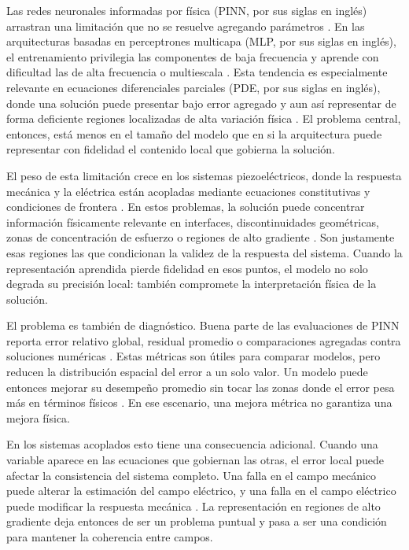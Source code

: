 \label{sec:justificacion}

Las redes neuronales informadas por física (PINN, por sus siglas en inglés) arrastran una limitación que no se resuelve agregando parámetros \cite{grossmann2024,krishnapriyan2021}. En las arquitecturas basadas en perceptrones multicapa (MLP, por sus siglas en inglés), el entrenamiento privilegia las componentes de baja frecuencia y aprende con dificultad las de alta frecuencia o multiescala \cite{rahaman2019,tancik2020,wang2021eigenvector}. Esta tendencia es especialmente relevante en ecuaciones diferenciales parciales (PDE, por sus siglas en inglés), donde una solución puede presentar bajo error agregado y aun así representar de forma deficiente regiones localizadas de alta variación física \cite{krishnapriyan2021,deryckmishra2022,grossmann2024}. El problema central, entonces, está menos en el tamaño del modelo que en si la arquitectura puede representar con fidelidad el contenido local que gobierna la solución.

El peso de esta limitación crece en los sistemas piezoeléctricos, donde la respuesta mecánica y la eléctrica están acopladas mediante ecuaciones constitutivas y condiciones de frontera \cite{tandis2025piezoelectric,mouratidou2026shunted}. En estos problemas, la solución puede concentrar información físicamente relevante en interfaces, discontinuidades geométricas, zonas de concentración de esfuerzo o regiones de alto gradiente \cite{wang2004intensity}. Son justamente esas regiones las que condicionan la validez de la respuesta del sistema. Cuando la representación aprendida pierde fidelidad en esos puntos, el modelo no solo degrada su precisión local: también compromete la interpretación física de la solución.

El problema es también de diagnóstico. Buena parte de las evaluaciones de PINN reporta error relativo global, residual promedio o comparaciones agregadas contra soluciones numéricas \cite{raissi2019,lu2021deepxde,grossmann2024}. Estas métricas son útiles para comparar modelos, pero reducen la distribución espacial del error a un solo valor. Un modelo puede entonces mejorar su desempeño promedio sin tocar las zonas donde el error pesa más en términos físicos \cite{krishnapriyan2021}. En ese escenario, una mejora métrica no garantiza una mejora física.

En los sistemas acoplados esto tiene una consecuencia adicional. Cuando una variable aparece en las ecuaciones que gobiernan las otras, el error local puede afectar la consistencia del sistema completo. Una falla en el campo mecánico puede alterar la estimación del campo eléctrico, y una falla en el campo eléctrico puede modificar la respuesta mecánica \cite{mouratidou2026shunted,tandis2025piezoelectric}. La representación en regiones de alto gradiente deja entonces de ser un problema puntual y pasa a ser una condición para mantener la coherencia entre campos.

